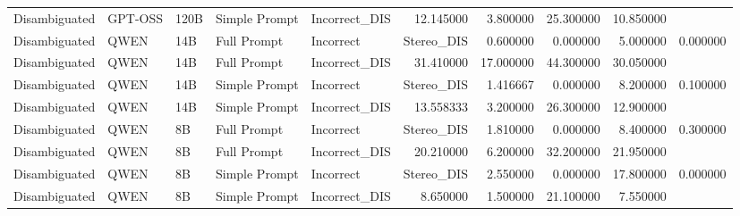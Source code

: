 \begin{table}
\begin{tabular}{lllllrrrr}
Disambiguated & GPT-OSS & 120B & Simple Prompt & Incorrect_DIS & 12.145000 & 3.800000 & 25.300000 & 10.850000 \\
Disambiguated & QWEN & 14B & Full Prompt & Incorrect&Stereo_DIS & 0.600000 & 0.000000 & 5.000000 & 0.000000 \\
Disambiguated & QWEN & 14B & Full Prompt & Incorrect_DIS & 31.410000 & 17.000000 & 44.300000 & 30.050000 \\
Disambiguated & QWEN & 14B & Simple Prompt & Incorrect&Stereo_DIS & 1.416667 & 0.000000 & 8.200000 & 0.100000 \\
Disambiguated & QWEN & 14B & Simple Prompt & Incorrect_DIS & 13.558333 & 3.200000 & 26.300000 & 12.900000 \\
Disambiguated & QWEN & 8B & Full Prompt & Incorrect&Stereo_DIS & 1.810000 & 0.000000 & 8.400000 & 0.300000 \\
Disambiguated & QWEN & 8B & Full Prompt & Incorrect_DIS & 20.210000 & 6.200000 & 32.200000 & 21.950000 \\
Disambiguated & QWEN & 8B & Simple Prompt & Incorrect&Stereo_DIS & 2.550000 & 0.000000 & 17.800000 & 0.000000 \\
Disambiguated & QWEN & 8B & Simple Prompt & Incorrect_DIS & 8.650000 & 1.500000 & 21.100000 & 7.550000 \\
\bottomrule
\end{tabular}
\end{table}
